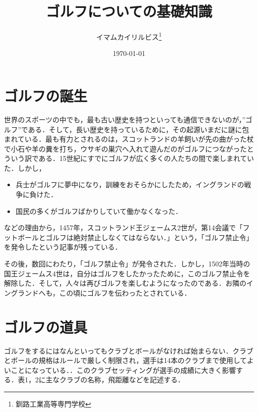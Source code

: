 \documentclass[a4j, twocolumn]{jarticle}
\begin{document}
\title{ゴルフについての基礎知識}
\author{イマムカイリルビス\thanks{釧路工業高等専門学校}}
\date{\today}

\maketitle

\section{ゴルフの誕生}

世界のスポーツの中でも，最も古い歴史を持つといっても通信できないのが，”ゴルフ”である．そして，長い歴史を持っているために，その起源いまだに謎に包まれている．最も有力とされるのは，スコットランドの羊飼いが先の曲がった杖で小石や羊の糞を打ち，ウサギの巣穴へ入れて遊んだのがゴルフにつながったとういう訳である．15世紀にすでにゴルフが広く多くの人たちの間で楽しまれていた．しかし，
\begin{itemize}
    \item 兵士がゴルフに夢中になり，訓練をおそらかにしたため，イングランドの戦争に負けた．
    \item 国民の多くがゴルフばかりしていて働かなくなった．
\end{itemize}
などの理由から，1457年，スコットランド王ジェームス2世が，第14会議で「フットボールとゴルフは絶対禁止しなくてはならない．」という，「ゴルフ禁止令」を発令したという記事が残っている．\cite{bib1}\\

\vspace{-15pt}

その後，数回にわたり，「ゴルフ禁止令」が発令された．しかし，1502年当時の国王ジェームス4世は，自分はゴルフをしたかったために，このゴルフ禁止令を解除した．そして，人々は再びゴルフを楽しむようになったのである．お隣のイングランドへも，この頃にゴルフを伝わったとされている．\cite{bib1}\\

\section{ゴルフの道具}

ゴルフをするにはなんといってもクラブとボールがなければ始まらない．クラブとボールの規格はルールで厳しく制限され，選手は14本のクラブまで使用してよいことになっている．\cite{bib2}．このクラブセッティングが選手の成績に大きく影響する．表1，2に主なクラブの名称，飛距離などを記述する．
\end{document}
